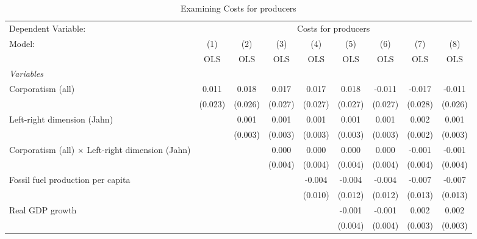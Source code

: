 
\begin{table}[htbp]
   \caption{Examining Costs for producers}
   \centering
   \begin{tabular}{lcccccccc}
      \toprule
      Dependent Variable: & \multicolumn{8}{c}{Costs for producers}\\
      Model:                                                  & (1)     & (2)     & (3)     & (4)     & (5)     & (6)     & (7)     & (8)\\  
                                                              &  OLS    & OLS     & OLS     & OLS     & OLS     & OLS     & OLS     & OLS\\  
      \midrule
      \emph{Variables}\\
      Corporatism (all)                                       & 0.011   & 0.018   & 0.017   & 0.017   & 0.018   & -0.011  & -0.017  & -0.011\\   
                                                              & (0.023) & (0.026) & (0.027) & (0.027) & (0.027) & (0.027) & (0.028) & (0.026)\\   
      Left-right dimension (Jahn)                             &         & 0.001   & 0.001   & 0.001   & 0.001   & 0.001   & 0.002   & 0.001\\   
                                                              &         & (0.003) & (0.003) & (0.003) & (0.003) & (0.003) & (0.002) & (0.003)\\   
      Corporatism (all) $\times$ Left-right dimension (Jahn)  &         &         & 0.000   & 0.000   & 0.000   & 0.000   & -0.001  & -0.001\\   
                                                              &         &         & (0.004) & (0.004) & (0.004) & (0.004) & (0.004) & (0.004)\\   
      Fossil fuel production per capita                       &         &         &         & -0.004  & -0.004  & -0.004  & -0.007  & -0.007\\   
                                                              &         &         &         & (0.010) & (0.012) & (0.012) & (0.013) & (0.013)\\   
      Real GDP growth                                         &         &         &         &         & -0.001  & -0.001  & 0.002   & 0.002\\   
                                                              &         &         &         &         & (0.004) & (0.004) & (0.003) & (0.003)\\   

\end{tabular}
\end{table}
